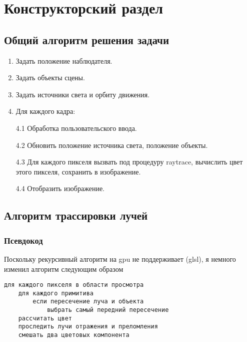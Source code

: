 \chapter{Конструкторский раздел}
\label{cha:design}


\section{Общий алгоритм решения задачи}

\begin{enumerate}
\item Задать положение наблюдателя.

\item Задать объекты сцены.

\item Задать источники света и орбиту движения.

\item Для каждого кадра:

4.1 Обработка пользовательского ввода.

4.2 Обновить положение источника света, положение объекты.

4.3 Для каждого пикселя вызвать под процедуру raytrace, вычислить цвет этого пикселя, сохранить в изображение.

4.4 Отобразить изображение.
\end{enumerate}


\section{Алгоритм трассировки лучей}

\subsection*{Псевдокод}

Поскольку рекурсивный алгоритм на gpu не поддерживает (glsl), я немного изменил алгоритм следующим образом


\begin{verbatim}
для каждого пикселя в области просмотра
    для каждого примитива
        если пересечение луча и объекта
            выбрать самый передний пересечение
    рассчитать цвет
    проследить лучи отражения и преломления
    смешать два цветовых компонента
\end{verbatim}


